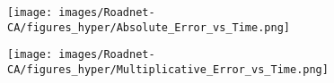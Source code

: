 \begin{figure*}[htbp]
\begin{subfigure}[b]{\textwidth}
	\end{subfigure}
	\begin{subfigure}[b]{\textwidth}
		\centering
		\begin{minipage}[b]{0.05\textwidth}
			\centering
		\end{minipage}%
		\begin{minipage}[b]{0.3\textwidth}
			\centering
			\texttt{[image: images/Roadnet-CA/figures\_hyper/Absolute\_Error\_vs\_Time.png]} %
			
		\end{minipage}%
		\begin{minipage}[b]{0.3\textwidth}
			\centering
			
			\texttt{[image: images/Roadnet-CA/figures\_hyper/Multiplicative\_Error\_vs\_Time.png]} %
			
		\end{minipage}%
		\begin{minipage}[b]{0.3\textwidth}
			\centering
			

\end{minipage}
\end{subfigure}
\end{figure*}
